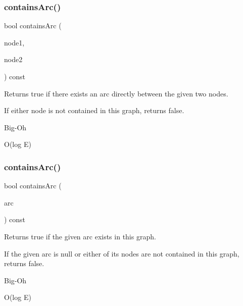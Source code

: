 \subsubsection{\texorpdfstring{contains\+Arc()}{containsArc()}\hspace{0.1cm}{\footnotesize\ttfamily [2/3]}}
{\footnotesize\ttfamily bool contains\+Arc (\begin{DoxyParamCaption}\item[{const std\+::string \&}]{node1,  }\item[{const std\+::string \&}]{node2 }\end{DoxyParamCaption}) const}



Returns true if there exists an arc directly between the given two nodes. 

If either node is not contained in this graph, returns false. \begin{DoxyRefDesc}{Big-\/\+Oh}
\item[\mbox{\hyperlink{BigOh__BigOh000054}{Big-\/\+Oh}}]O(log E) \end{DoxyRefDesc}
\mbox{\label{classGraph_acf7a659ddd8a143836b91b01c200ee8a}} 
\subsubsection{\texorpdfstring{contains\+Arc()}{containsArc()}\hspace{0.1cm}{\footnotesize\ttfamily [3/3]}}
{\footnotesize\ttfamily bool contains\+Arc (\begin{DoxyParamCaption}\item[{Arc\+Type $\ast$}]{arc }\end{DoxyParamCaption}) const}



Returns true if the given arc exists in this graph. 

If the given arc is null or either of its nodes are not contained in this graph, returns false. \begin{DoxyRefDesc}{Big-\/\+Oh}
\item[\mbox{\hyperlink{BigOh__BigOh000055}{Big-\/\+Oh}}]O(log E) \end{DoxyRefDesc}
\mbox{\label{classGraph_ac0beb77e8a238c2898ab851df71eeefe}} 
